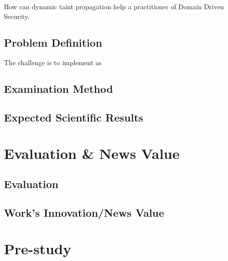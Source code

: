 \documentclass{../kththesis}
\begin{document}
How can dynamic taint propagation help a practitioner of Domain Driven Security.

\section{Problem Definition}

The challenge is to implement as 

\section{Examination Method}

\section{Expected Scientific Results}



\chapter{Evaluation \& News Value}

\section{Evaluation}

\section{Work's Innovation/News Value}



\chapter{Pre-study}
\end{document}
